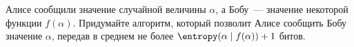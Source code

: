Алисе сообщили значение случайной величины $\alpha$, а Бобу~--- значение некоторой функции
$f(\alpha)$. Придумайте алгоритм, который позволит Алисе сообщить Бобу значение $\alpha$, передав в
среднем не более $\entropy(\alpha \mid f(\alpha)) + 1$ битов.
